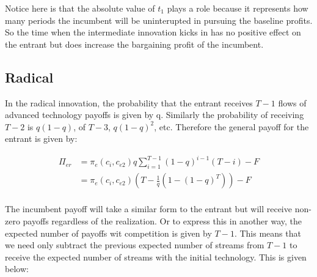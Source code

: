 Notice here is that the absolute value of $t_1$ plays a role because it represents how many periods the incumbent will be uninterupted in pursuing the baseline profits. So the time when the intermediate innovation kicks in has no positive effect on the entrant but does increase the bargaining profit of the incumbent. 

\subsection{Radical}

In the radical innovation, the probability that the entrant receives $T-1$ flows of advanced technology payoffs is given by q. Similarly the probability of receiving $T-2$ is $q(1-q)$, of $T-3$, $q(1-q)^2$, etc. Therefore the general payoff for the entrant is given by:

\begin{align*}
\Pi_{er} & = 
\pi_{e}(c_i,c_{e2}) q \sum_{i=1}^{T-1} (1-q)^{i-1} (T-i) -F \\
&= \pi_{e}(c_i,c_{e2}) \left( T- \frac{1}{q} \left( 1-(1-q)^{T} \right) \right) -F \\
\end{align*}

The incumbent payoff will take a similar form to the entrant but will receive non-zero payoffs regardless of the realization. Or to express this in another way, the expected number of payoffs wit competition is given by $T-1$. This means that we need only subtract the previous expected number of streams from $T-1$ to receive the expected number of streams with the initial technology. This is given below: 


